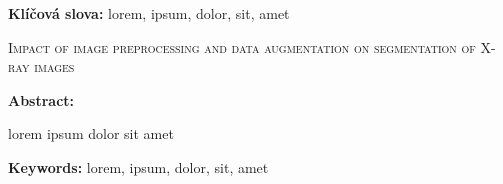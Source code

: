 \documentclass[male,czech,api_ing]{thesis}
\newcommand{\nazeven}{Impact of image preprocessing and data augmentation on segmentation of X-ray images}     %
\begin{document}
\textbf{Klíčová slova:} lorem, ipsum, dolor, sit, amet

\bigskip


\textsc{\nazeven}

\textbf{Abstract:}

lorem ipsum dolor sit amet

\textbf{Keywords:} lorem, ipsum, dolor, sit, amet

\tableofcontents

	     
	
                     
\end{document}
